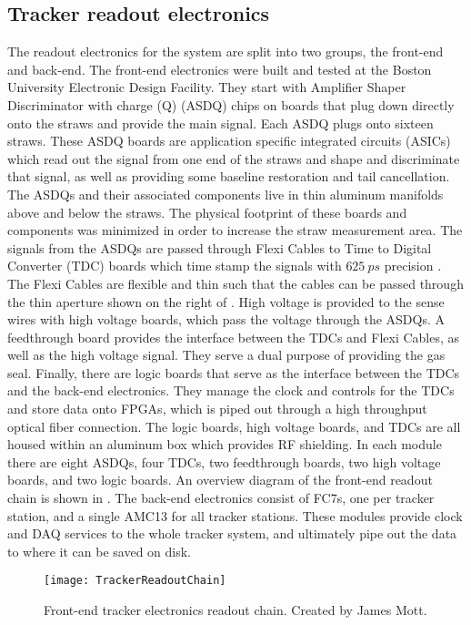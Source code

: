 \subsection{Tracker readout electronics}


The readout electronics for the system are split into two groups, the front-end and back-end. The front-end electronics were built and tested at the Boston University Electronic Design Facility. They start with Amplifier Shaper Discriminator with charge (Q) (ASDQ) chips on boards that plug down directly onto the straws and provide the main signal. Each ASDQ plugs onto sixteen straws. These ASDQ boards are application specific integrated circuits (ASICs) which read out the signal from one end of the straws and shape and discriminate that signal, as well as providing some baseline restoration and tail cancellation. The ASDQs and their associated components live in thin aluminum manifolds above and below the straws. The physical footprint of these boards and components was minimized in order to increase the straw measurement area. The signals from the ASDQs are passed through Flexi Cables to Time to Digital Converter (TDC) boards which time stamp the signals with $\SI{625}{ps}$ precision \cite{WTThesis}. The Flexi Cables are flexible and thin such that the cables can be passed through the thin aperture shown on the right of . High voltage is provided to the sense wires with high voltage boards, which pass the voltage through the ASDQs. A feedthrough board provides the interface between the TDCs and Flexi Cables, as well as the high voltage signal. They serve a dual purpose of providing the gas seal. Finally, there are logic boards that serve as the interface between the TDCs and the back-end electronics. They manage the clock and controls for the TDCs and store data onto FPGAs, which is piped out through a high throughput optical fiber connection. The logic boards, high voltage boards, and TDCs are all housed within an aluminum box which provides RF shielding. In each module there are eight ASDQs, four TDCs, two feedthrough boards, two high voltage boards, and two logic boards. An overview diagram of the front-end readout chain is shown in . The back-end electronics consist of FC7s, one per tracker station, and a single AMC13 for all tracker stations. These modules provide clock and DAQ services to the whole tracker system, and ultimately pipe out the data to where it can be saved on disk.


\begin{figure}[]
    \centering
    \texttt{[image: TrackerReadoutChain]}
    \caption[Tracker electronics readout chain]{Front-end tracker electronics readout chain. Created by James Mott.}   
    \label{fig:TrackerReadoutChain}
\end{figure}


\cleardoublepage

